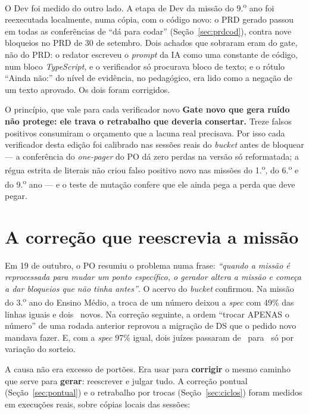 \documentclass[11pt,a4paper]{article}
\newcommand{\bolinha}[1]{\tikz[baseline=-0.5ex]{\fill[#1] (0,0) circle (0.33em);}}
\newcommand{\statusVerde}{\bolinha{sinalVerde}}
\newcommand{\statusAmbar}{\bolinha{sinalAmbar}}
\newcommand{\statusVermelho}{\bolinha{sinalVermelho}}
\begin{document}
O Dev foi medido do outro lado. A etapa de Dev da missão do 9.\textsuperscript{o} ano foi reexecutada localmente, numa cópia, com o código novo: o PRD gerado passou em todas as conferências de ``dá para codar'' (Seção~\ref{sec:prdcod}), contra nove bloqueios no PRD de 30 de setembro. Dois achados que sobraram eram do gate, não do PRD: o redator escreveu o \emph{prompt} da IA como uma constante de código, num bloco \emph{TypeScript}, e o verificador só procurava bloco de texto; e o rótulo ``Ainda não:'' do nível de evidência, no pedagógico, era lido como a negação de um texto aprovado. Os dois foram corrigidos.

\begin{caixaConceito}{O princípio, que vale para cada verificador novo}
\textbf{Gate novo que gera ruído não protege: ele trava o retrabalho que deveria consertar.} Treze falsos positivos consumiram o orçamento que a lacuna real precisava. Por isso cada verificador desta edição foi calibrado nas sessões reais do \emph{bucket} antes de bloquear --- a conferência do \emph{one-pager} do PO dá zero perdas na versão só reformatada; a régua estrita de literais não criou falso positivo novo nas missões do 1.\textsuperscript{o}, do 6.\textsuperscript{o} e do 9.\textsuperscript{o} ano --- e o teste de mutação confere que ele ainda pega a perda que deve pegar.
\end{caixaConceito}

\section{A correção que reescrevia a missão}
\label{sec:licao-pontual}

Em 19 de outubro, o PO resumiu o problema numa frase: \emph{``quando a missão é reprocessada para mudar um ponto específico, o gerador altera a missão e começa a dar bloqueios que não tinha antes''}. O acervo do \emph{bucket} confirmou. Na missão do 3.\textsuperscript{o} ano do Ensino Médio, a troca de um número deixou a \emph{spec} com 49\% das linhas iguais e dois \statusVermelho\ novos. Na correção seguinte, a ordem ``trocar APENAS o número'' de uma rodada anterior reprovou a migração de DS que o pedido novo mandava fazer. E, com a \emph{spec} 97\% igual, dois juízes passaram de \statusVerde\ para \statusAmbar\ só por variação do sorteio.

A causa não era excesso de portões. Era usar para \textbf{corrigir} o mesmo caminho que serve para \textbf{gerar}: reescrever e julgar tudo. A correção pontual (Seção~\ref{sec:pontual}) e o retrabalho por trocas (Seção~\ref{sec:ciclos}) foram medidos em execuções reais, sobre cópias locais das sessões:
\end{document}
